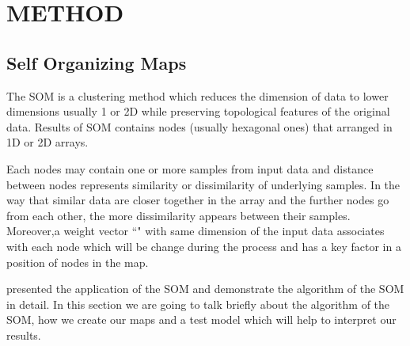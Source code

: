 
\section{METHOD}
\label{sec: method}
 \subsection{Self Organizing Maps}
 \label{sec: som}
 
 The SOM is a clustering method which reduces the dimension of data to lower dimensions usually 1 or 2D while preserving topological features of the original data.
 Results of SOM contains nodes (usually hexagonal ones) that arranged in 1D or 2D arrays.
 
 Each nodes may contain one or more samples from input data and distance between nodes represents similarity or dissimilarity of underlying samples. 
 In the way that similar data are closer together in the array and the further nodes go from each other, the more dissimilarity appears between their samples.
 Moreover,a weight vector ``" with same dimension of the input data associates with each node which will be change during the process and has a key factor in a position of nodes in the map. 
 
 \cite{Geach12} presented the application of the SOM and demonstrate the algorithm of the SOM in detail. In this section we are going to talk briefly about the algorithm of the SOM, how we create our maps and a test model which will help to interpret our results. %
 
